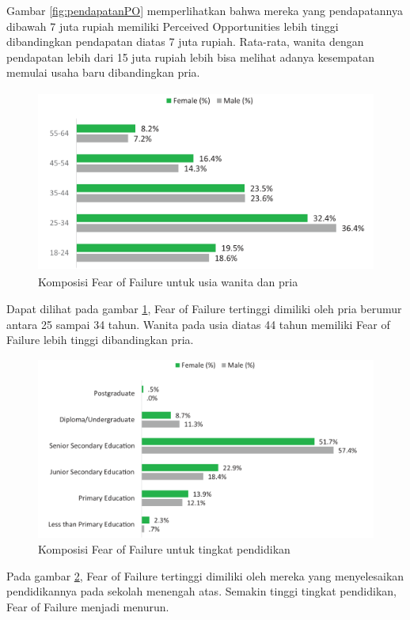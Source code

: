 Gambar \ref{fig:pendapatanPO} memperlihatkan bahwa mereka yang pendapatannya dibawah 7 juta rupiah memiliki Perceived Opportunities lebih tinggi dibandingkan pendapatan diatas 7 juta rupiah. Rata-rata, wanita dengan pendapatan lebih dari 15 juta rupiah lebih bisa melihat adanya kesempatan memulai usaha baru dibandingkan pria.

\begin{figure} [H]
	\centering  
	\includegraphics[width=13cm, height=6cm]{usiaFF2013} 
	\caption[Komposisi Fear of Failure untuk usia wanita dan pria]{Komposisi Fear of Failure untuk usia wanita dan pria} 
	\label{fig:umurFF} 
\end{figure} 

Dapat dilihat pada gambar \ref{fig:umurFF}, Fear of Failure tertinggi dimiliki oleh pria berumur antara 25 sampai 34 tahun. Wanita pada usia diatas 44 tahun memiliki Fear of Failure lebih tinggi dibandingkan pria.

\begin{figure} [H]
	\centering  
	\includegraphics[width=13cm, height=6cm]{pendidikanFF2013} 
	\caption[Komposisi Fear of Failure untuk tingkat pendidikan]{Komposisi Fear of Failure untuk tingkat pendidikan} 
	\label{fig:pendidikanFF} 
\end{figure} 

Pada gambar \ref{fig:pendidikanFF}, Fear of Failure tertinggi dimiliki oleh mereka yang menyelesaikan pendidikannya pada sekolah menengah atas. Semakin tinggi tingkat pendidikan, Fear of Failure menjadi menurun.

